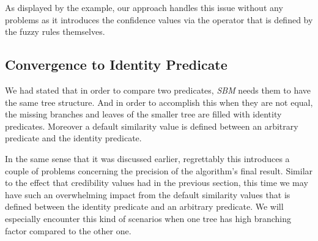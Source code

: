 As displayed by the example, our approach handles this issue without any problems as it introduces the confidence values via the operator that is defined by the fuzzy rules themselves.


\subsection{Convergence to Identity Predicate}
\label{conv2}
We had stated that in order to compare two predicates, \textit{SBM} needs them to have the same tree structure. And in order to accomplish this when they are not equal, the missing branches and leaves of the smaller tree are filled with identity predicates. Moreover a default similarity value is defined between an arbitrary predicate and the identity predicate. 

In the same sense that it was discussed earlier, regrettably this introduces a couple of problems concerning the precision of the algorithm's final result. Similar to the effect that credibility values had in the previous section, this time we may have such an overwhelming impact from the default similarity values that is defined between the identity predicate and an arbitrary predicate.  We will especially encounter this kind of scenarios when one tree has high branching factor compared to the other one.


